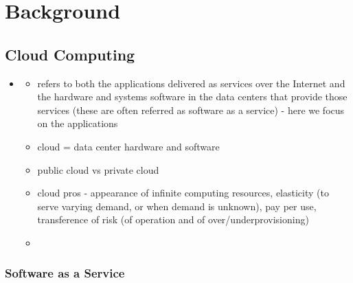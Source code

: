 \chapter{Background}


\section{Cloud Computing}

\begin{itemize}
	\item \cite{AboveTheClouds}
	\begin{itemize}
		\item refers to both the applications delivered as services over the Internet and the hardware and systems software in the data centers that provide those services (these are often referred as software as a service) - here we focus on the applications
		\item cloud = data center hardware and software
		\item public cloud vs private cloud
		\item cloud pros - appearance of infinite computing resources, elasticity (to serve varying demand, or when demand is unknown), pay per use, transference of risk (of operation and of over/underprovisioning)
		\item 
	\end{itemize}
\end{itemize}

\subsection{Software as a Service}

